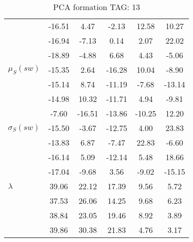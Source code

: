 \begin{table}[h!]
\begin{center}
\begin{tabular}{| l || c | c | c | c | c |}
 & -16.51  & 4.47  & -2.13  & 12.58  & 10.27 \\
 & -16.94  & -7.13  & 0.14  & 2.07  & 22.02 \\
 & -18.89  & -4.88  & 6.68  & 4.43  & -5.06 \\\hline
$\mu_S(sw)$ & -15.35  & 2.64  & -16.28  & 10.04  & -8.90 \\
 & -15.14  & 8.74  & -11.19  & -7.68  & -13.14 \\
 & -14.98  & 10.32  & -11.71  & 4.94  & -9.81 \\
 & -7.60  & -16.51  & -13.86  & -10.25  & 12.20 \\\hline
$\sigma_S(sw)$ & -15.50  & -3.67  & -12.75  & 4.00  & 23.83 \\
 & -13.83  & 6.87  & -7.47  & 22.83  & -6.60 \\
 & -16.14  & 5.09  & -12.14  & 5.48  & 18.66 \\
 & -17.04  & -9.68  & 3.56  & -9.02  & -15.15 \\\hline\hline
$\lambda$ & 39.06  & 22.12  & 17.39  & 9.56  & 5.72 \\
 & 37.53  & 26.06  & 14.25  & 9.68  & 6.23 \\
 & 38.84  & 23.05  & 19.46  & 8.92  & 3.89 \\
 & 39.86  & 30.38  & 21.83  & 4.76  & 3.17 \\\hline
\end{tabular}
\caption{PCA formation TAG: 13}
\end{center}
\end{table}